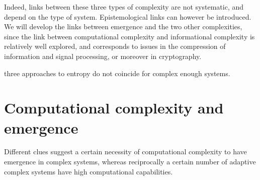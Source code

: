 Indeed, links between these three types of complexity are not systematic, and depend on the type of system. Epistemological links can however be introduced. We will develop the links between emergence and the two other complexities, since the link between computational complexity and informational complexity is relatively well explored, and corresponds to issues in the compression of information and signal processing, or moreover in cryptography.


\cite{thurner2017three} three approaches to entropy do not coincide for complex enough systems.



\section{Computational complexity and emergence}

Different clues suggest a certain necessity of computational complexity to have emergence in complex systems, whereas reciprocally a certain number of adaptive complex systems have high computational capabilities.



